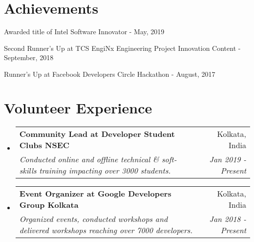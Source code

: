 \documentclass[a4paper,20pt]{article}
\makeatletter
\newcommand{\resumeSubheading}[4]{
  \vspace{-1pt}\item
    \begin{tabular*}{0.97\textwidth}{l@{\extracolsep{\fill}}r}
      \textbf{#1} & #2 \\
      \textit{#3} & \textit{#4} \\
    \end{tabular*}\vspace{-5pt}
}
\newcommand{\resumeSubHeadingListStart}{\begin{itemize}[leftmargin=*]}
\newcommand{\resumeSubHeadingListEnd}{\end{itemize}}
\makeatother
\begin{document}
\section{Achievements}
\begin{description}[font=$\bullet$]
\item {Awarded title of Intel Software Innovator - May, 2019}
\vspace{-5pt}
\item {Second Runner's Up at TCS EngiNx Engineering Project Innovation Content - September, 2018 }
\vspace{-5pt}
\item {Runner's Up at Facebook Developers Circle Hackathon - August, 2017}

\end{description}

\vspace{-5pt}
\section{Volunteer Experience}
  \resumeSubHeadingListStart
	\resumeSubheading
    {Community Lead at Developer Student Clubs NSEC}{Kolkata, India}
    {Conducted online and offline technical \& soft-skills training impacting over 3000 students.}{Jan 2019 - Present}
\vspace{5pt}
    \resumeSubheading
    {Event Organizer at Google Developers Group Kolkata}{Kolkata, India}
    {Organized events, conducted workshops and delivered workshops reaching over 7000 developers.}{Jan 2018 - Present}

\resumeSubHeadingListEnd
\end{document}
